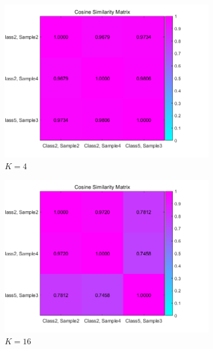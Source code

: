 \label{subsec:Q1_cossim}
\begin{figure}[htbp]
	\centering
	\begin{subfigure}[t]{0.25\linewidth}
		\centering
		\includegraphics[width=\linewidth]{image/q1-appendix/similarity_4.png} 
		\caption{$K=4$}
	\end{subfigure}%
	\hfill
	\begin{subfigure}[t]{0.25\linewidth}
		\centering
		\includegraphics[width=\linewidth]{image/q1-appendix/similarity_16.png} 
		\caption{$K=16$}
	\end{subfigure}%
	\hfill
	\begin{subfigure}[t]{0.25\linewidth}
		\centering

\end{subfigure}
\end{figure}
